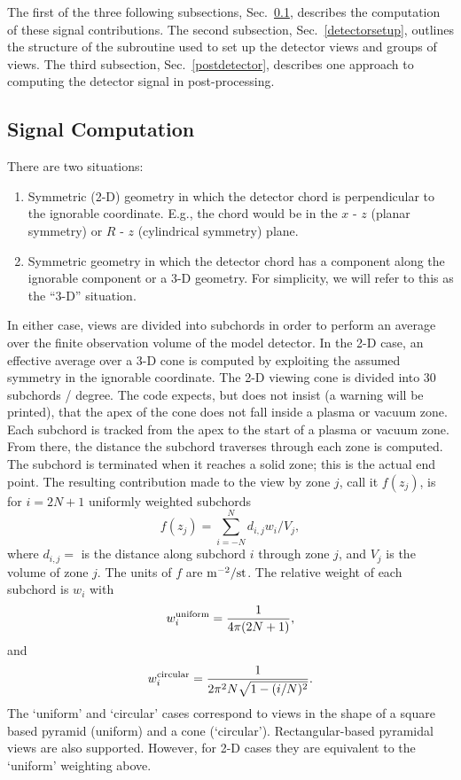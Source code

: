 \documentclass[12pt]{report}
\begin{document}
The first of the three following subsections, Sec.~\ref{frags}, describes
the computation of these signal contributions.  The second subsection,
Sec.~\ref{detectorsetup}, outlines the structure of the subroutine
used to set up the detector views and groups of views.  The third
subsection, Sec.~\ref{postdetector}, describes one approach to
computing the detector signal in post-processing.

\subsection{Signal Computation}
\label{frags}

There are two situations:
\begin{enumerate}
  \item Symmetric (2-D) geometry in which the detector chord
is perpendicular to the ignorable coordinate.  E.g., the
chord would be in the $x$ - $z$ (planar symmetry) or $R$ - $z$
(cylindrical symmetry) plane.
  \item Symmetric geometry in which the detector chord has a
component along the ignorable component or a 3-D geometry.
For simplicity, we will refer to this as the ``3-D'' situation.
\end{enumerate}

In either case, views are divided into subchords in order 
to perform an average over the finite observation volume of the model detector.
In the 2-D case, an effective average over a 3-D cone is computed
by exploiting the assumed symmetry in the ignorable coordinate.
The 2-D viewing cone is divided into 30 subchords / degree. The code
expects, but does not insist (a warning will be printed), 
that the apex of the cone does not
fall inside a plasma or vacuum zone. Each subchord is tracked from the
apex to the start of a plasma or vacuum zone. From there, the distance
the subchord traverses through each zone is computed. The subchord is
terminated when it reaches a solid zone; this is the actual end point.
The resulting contribution made to the view by zone $j$, call it $f(z_{j})$,
is for $i = 2N+1$
uniformly weighted subchords
\begin{equation}
f(z_{j}) = \sum_{i=-N}^{N}  d_{i,j} w_{i} / V_{j},
\label{zonefrag}
\end{equation}
where $d_{i,j} = $ is the distance along subchord $i$ through zone $j$, 
and $V_{j}$ is the volume of zone $j$. The units of $f$ are ${\rm m}^{-2}/{\rm st}$.  The relative weight of each
subchord is $w_{i}$ with
\begin{equation}
w_{i}^{\rm uniform} = \frac{1}{4 \pi (2N + 1)},
\end{equation}
and
\begin{equation}
w_{i}^{\rm circular} = \frac{1}{2 \pi^{2} N \sqrt{1 - (i/N)^2}}.
\end{equation}
The `uniform' and `circular' cases correspond to views in the shape of a square based pyramid (uniform) and 
a cone (`circular'). Rectangular-based pyramidal views are also supported. 
However, for 2-D cases they are equivalent to the `uniform' weighting above. 
\end{document}
